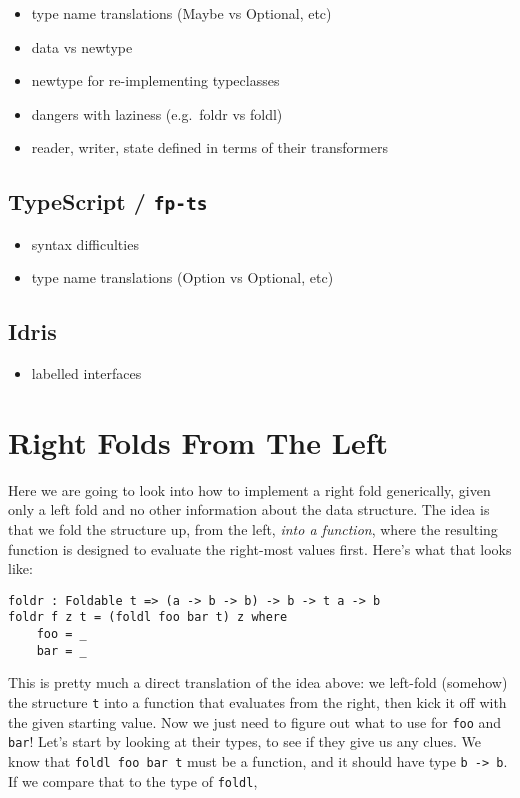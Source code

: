 \documentclass{book}
\newcommand{\mlil}[1]{\lstinline[language=pseudoml,columns=fixed]|#1|}\usepackage{caption}
\begin{document}
\begin{itemize}
    \item type name translations (Maybe vs Optional, etc)
    \item data vs newtype
    \item newtype for re-implementing typeclasses
    \item dangers with laziness (e.g.\ foldr vs foldl)
    \item reader, writer, state defined in terms of their transformers
\end{itemize}

\subsection{TypeScript / \texttt{fp-ts}}\label{lang:fp-ts}

\begin{itemize}
    \item syntax difficulties
    \item type name translations (Option vs Optional, etc)
\end{itemize}

\subsection{Idris}\label{lang:idris}

\begin{itemize}
    \item labelled interfaces
\end{itemize}

\section{Right Folds From The Left}\label{endo}

Here we are going to look into how to implement a right fold generically, given only a left fold and no other information about the data structure. The idea is that we fold the structure up, from the left, \emph{into a function}, where the resulting function is designed to evaluate the right-most values first. Here's what that looks like:

\begin{lstlisting}[language=pseudoml]
foldr : Foldable t => (a -> b -> b) -> b -> t a -> b
foldr f z t = (foldl foo bar t) z where
    foo = _
    bar = _
\end{lstlisting}

This is pretty much a direct translation of the idea above: we left-fold (somehow) the structure \texttt{t} into a function that evaluates from the right, then kick it off with the given starting value. Now we just need to figure out what to use for \texttt{foo} and \texttt{bar}! Let's start by looking at their types, to see if they give us any clues. We know that \mlil{foldl foo bar t} must be a function, and it should have type \mlil{b -> b}. If we compare that to the type of \mlil{foldl},
\end{document}
